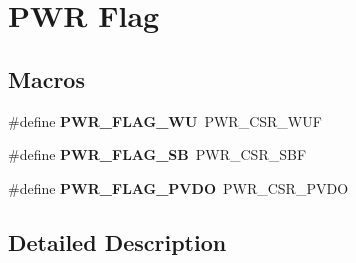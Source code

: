 \hypertarget{group___p_w_r___flag}{}\section{P\+WR Flag}
\label{group___p_w_r___flag}
\subsection*{Macros}
\begin{DoxyCompactItemize}
\item 
\mbox{\label{group___p_w_r___flag_ga2d06760a5769e729b06d41e37036d58e}} 
\#define {\bfseries P\+W\+R\+\_\+\+F\+L\+A\+G\+\_\+\+WU}~P\+W\+R\+\_\+\+C\+S\+R\+\_\+\+W\+UF
\item 
\mbox{\label{group___p_w_r___flag_ga9e55f0b5dec2346d5c8dee3ab3c0c2df}} 
\#define {\bfseries P\+W\+R\+\_\+\+F\+L\+A\+G\+\_\+\+SB}~P\+W\+R\+\_\+\+C\+S\+R\+\_\+\+S\+BF
\item 
\mbox{\label{group___p_w_r___flag_gaefd05d58cc050eeef83a1b5c520b2c2a}} 
\#define {\bfseries P\+W\+R\+\_\+\+F\+L\+A\+G\+\_\+\+P\+V\+DO}~P\+W\+R\+\_\+\+C\+S\+R\+\_\+\+P\+V\+DO
\end{DoxyCompactItemize}


\subsection{Detailed Description}

